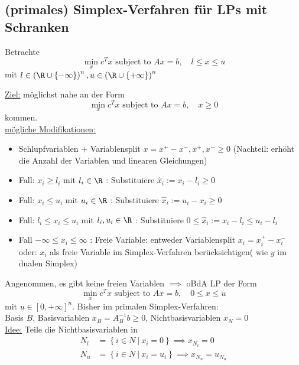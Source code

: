 \subsection{(primales) Simplex-Verfahren für LPs mit Schranken}
Betrachte
\begin{equation*}
	\min_{x} c^{T} x \text{ subject to } Ax = b ,\quad l \leq x \leq u
\end{equation*}
mit $l \in \left(\R \cup \left\{ - \infty \right\} \right)^n,u \in \left(\R \cup \left\{ +\infty \right\} \right)^n $

\underline{Ziel:} möglichst nahe an der Form 
\begin{equation*}
	\min_{x} c^{T} x \text{ subject to } Ax = b ,\quad x \geq 0
\end{equation*}
kommen.\\
\underline{mögliche Modifikationen:}
\begin{itemize}
	\item Schlupfvariablen + Variablensplit $x = x^+ -x^-, x^+,x^- \geq0 $ (Nachteil: erhöht die Anzahl der Variablen und linearen Gleichungen)
	\item Fall: $x_{i} \geq l_{i}$ mit $l_{i}\in \R$ : Substituiere $\hat{x}_{i} := x_{i}- l_{i}\geq 0$
	\item Fall: $x_{i} \leq u_{i}$ mit $u_{i}\in \R$ : Substituiere  $\hat{x}_{i} := u_{i}- x_{i}\geq 0$
	\item Fall: $l_{i} \leq x_{i} \leq u_{i}$ mit $l_{i},u_{i} \in \R$ : Substituiere $0 \leq \hat{x}_{i} := x_{i}- l_{i} \leq u_{i}-l_{i}$
	\item Fall $-\infty \leq x_{i} \leq \infty$ : Freie Variable: entweder Variablensplit $x_{i}= x_{i}^+ - x_{i}^-$ oder: $x_{i}$ als freie Variable im Simplex-Verfahren berücksichtigen( wie $y$ im dualen Simplex)
\end{itemize}
Angenommen, es gibt keine freien Variablen $\implies$ oBdA LP der Form 
\begin{equation*}
	\min_{x} c^{T} x \text{ subject to } Ax = b, \quad 0 \leq x \leq u 
\end{equation*}
mit $u \in [0, + \infty]^n$.\nl
Bisher im primalen Simplex-Verfahren:\\
Basis $B$, Basisvariablen $x_{B}= A_{B}^{-1} b \geq 0$, Nichtbasisvariablen $x_{N}=0$ \\
\underline{Idee:} Teile die Nichtbasisvariablen in 
\begin{align*}
	N_{l} &= \left\{ i \in N \ | \ x_{i} = 0  \right\} \implies x_{N_{l}}=0\\
	N_{u} &= \left\{ i \in N \ | \ x_{i} = u_{i}  \right\} \implies x_{N_{u}}=u_{N_{u}}
\end{align*}
